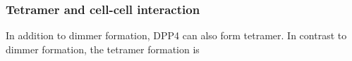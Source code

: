 \subsubsection{Tetramer and cell-cell interaction}

In addition to dimmer formation, DPP4 can also form tetramer. In contrast to dimmer formation, the tetramer formation is